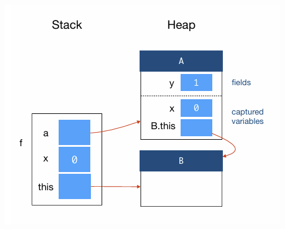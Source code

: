 \documentclass[10pt, landscape]{article}
\begin{document}
\begin{multicols}{4}
\columnbreak
\includegraphics[scale=0.35]{sh4}
\end{multicols}
\end{document}
